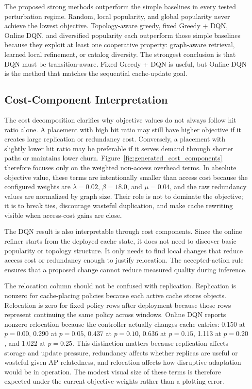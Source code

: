 The proposed strong methods outperform the simple baselines in every tested perturbation regime. Random, local popularity, and global popularity never achieve the lowest objective. Topology-aware greedy, fixed Greedy + DQN, Online DQN, and diversified popularity each outperform those simple baselines because they exploit at least one cooperative property: graph-aware retrieval, learned local refinement, or catalog diversity. The strongest conclusion is that DQN must be transition-aware. Fixed Greedy + DQN is useful, but Online DQN is the method that matches the sequential cache-update goal.

\subsection{Cost-Component Interpretation}

The cost decomposition clarifies why objective values do not always follow hit ratio alone. A placement with high hit ratio may still have higher objective if it creates large replication or redundancy cost. Conversely, a placement with slightly lower hit ratio may be preferable if it serves demand through shorter paths or maintains lower churn. Figure~\ref{fig:generated_cost_components} therefore focuses only on the weighted non-access overhead terms. In absolute objective value, these terms are intentionally smaller than access cost because the configured weights are \(\lambda=0.02\), \(\beta=18.0\), and \(\mu=0.04\), and the raw redundancy values are normalized by graph size. Their role is not to dominate the objective; it is to break ties, discourage wasteful duplication, and make cache rewriting visible when access-cost gains are close.

The DQN result is also interpretable through cost components. Since the online refiner starts from the deployed cache state, it does not need to discover basic popularity or topology structure. It only needs to find local changes that reduce access cost or redundancy enough to justify relocation. The accepted-action rule ensures that a proposed change cannot reduce measured quality during inference.

The relocation column should not be confused with replication. Replication is nonzero for cache-placing policies because each active cache stores objects. Relocation is zero for fixed policy rows after deployment because those rows represent continuing the same policy across windows. Online DQN reports nonzero relocation because the controller actually changes cache entries: 0.150 at \(p=0.00\), 0.290 at \(p=0.05\), 0.437 at \(p=0.10\), 0.636 at \(p=0.15\), 1.113 at \(p=0.20\), and 1.022 at \(p=0.25\). This distinction matters because replication affects storage and update pressure, redundancy affects whether replicas are useful or wasteful given AP relatedness, and relocation affects how disruptive adaptation would be in operation. The modest visual size of these terms is therefore expected under the current objective weights rather than a plotting error.

